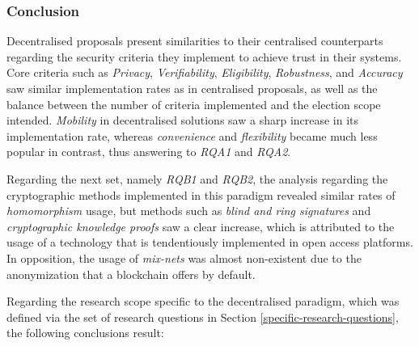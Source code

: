 \documentclass[../access.tex]{subfiles}
\begin{document}
\subsubsection{Conclusion}
    Decentralised proposals present similarities to their centralised counterparts regarding the security criteria they implement to achieve trust in their systems. Core criteria such as \textit{Privacy}, \textit{Verifiability}, \textit{Eligibility}, \textit{Robustness}, and \textit{Accuracy} saw similar implementation rates as in centralised proposals, as well as the balance between the number of criteria implemented and the election scope intended. \textit{Mobility} in decentralised solutions saw a sharp increase in its implementation rate, whereas \textit{convenience} and \textit{flexibility} became much less popular in contrast, thus answering to \emph{RQA1} and \emph{RQA2}.
	\par
    Regarding the next set, namely \emph{RQB1} and \emph{RQB2}, the analysis regarding the cryptographic methods implemented in this paradigm revealed similar rates of \textit{homomorphism} usage, but methods such as \textit{blind and ring signatures} and \textit{cryptographic knowledge proofs} saw a clear increase, which is attributed to the usage of a technology that is tendentiously implemented in open access platforms. In opposition, the usage of \textit{mix-nets} was almost non-existent due to the anonymization that a blockchain offers by default.
	\par
    Regarding the research scope specific to the decentralised paradigm, which was defined via the set of research questions in Section \ref{specific-research-questions}, the following conclusions result:
\end{document}
